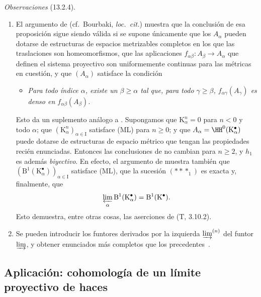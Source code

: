 \documentclass[oneside]{amsart}
\renewcommand{\geq}{\geqslant}
\let\EGAOriginalLabel\label
\renewcommand{\label}[1]{\phantomsection\EGAOriginalLabel{#1}}
\begin{document}
\begin{env}[13.2.4]
\label{0.13.2.4}
\emph{Observaciones} (13.2.4).
\begin{enumerate}
  \item[{\rm(i)}]
  El argumento de 
  (cf.\ Bourbaki, \emph{loc.\ cit.}) muestra que la conclusión de
  esa proposición sigue siendo válida si se supone únicamente que los
  $A_\alpha$ pueden dotarse de estructuras de espacios metrizables completos
  en los que las traslaciones son homeomorfismos, que las aplicaciones
  $f_{\alpha\beta}:A_\beta\longrightarrow A_\alpha$ que definen el
  sistema proyectivo son uniformemente continuas para las métricas en
  cuestión, y que $(A_\alpha)$ satisface la condición
  \begin{itemize}
    \item[(ML$'$)]
    \emph{Para todo índice $\alpha$, existe un $\beta\geq\alpha$ tal
    que, para todo $\gamma\geq\beta$,
    $f_{\alpha\gamma}(A_\gamma)$ es denso en
    $f_{\alpha\beta}(A_\beta)$.}
  \end{itemize}

  Esto da un suplemento análogo a .
  Supongamos que $\mathrm{K}^n_\alpha=0$ para $n<0$ y todo $\alpha$;
  que
  $(\mathrm{K}^n_\alpha)_{\alpha\in\mathrm{I}}$ satisface (ML) para
  $n\geq0$; y que
  $A_\alpha=\HH^0(\mathrm{K}^\bullet_\alpha)$ puede dotarse de
  estructuras de espacio métrico que tengan las propiedades recién enunciadas.
  Entonces las conclusiones de  no cambian para
  $n\geq2$, y $h_1$ es además \emph{biyectivo}.
  En efecto, el argumento de  muestra también que
  $(\mathrm{B}^1(\mathrm{K}^\bullet_\alpha))_{\alpha\in\mathrm{I}}$
  satisface (ML), que la sucesión $(***_1)$ es exacta y, finalmente,
  que
  \[
    \varprojlim_\alpha
    \mathrm{B}^1(\mathrm{K}^\bullet_\alpha)
    =
    \mathrm{B}^1(\mathrm{K}^\bullet).
  \]
  Esto demuestra, entre otras cosas, las aserciones de (T, 3.10.2).

  \item[{\rm(ii)}]
  Se pueden introducir los funtores derivados por la izquierda
  $\varinjlim^{(n)}$ del funtor $\varinjlim$, y obtener enunciados más
  completos que los precedentes~\cite{III-28}.
\end{enumerate}
\end{env}

\subsection{Aplicación: cohomología de un límite proyectivo de haces}
\label{subsection:0.13.3}
\end{document}

